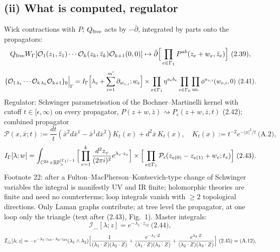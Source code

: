 \documentclass[10pt]{article}
\newcommand{\Itri}{\mathcal I_{\triangle}}
\begin{document}
\subsection{(ii) What is computed, regulator}
Wick contractions with $P$; $Q_{\rm free}$ acts by $-\bar\partial$, integrated by parts onto the propagators:
\begin{equation*}
Q_{\rm free}W_\Gamma[\mathcal O_1(z_1,\bar z_1)\cdots\mathcal O_k(z_k,\bar z_k)\mathcal O_{k+1}(0,0)]\\\mapsto\bar\partial\Big[\prod_{e\in\Gamma_1}P^{ab}(z_e+w_e,\bar z_e)\Big]\ \text{(2.39)},
\end{equation*}
\begin{equation*}
\{\mathcal O_{1\,\lambda_1}\cdots\mathcal O_{k\,\lambda_k}\mathcal O_{k+1}\}_0\Big|_\Gamma=I_\Gamma\Big[\lambda_v+\sum_{i=1}^{m'}\partial_{w_{v,i}};w_e\Big]\\\times\prod_{e\in\Gamma_1}\eta^{a_eb_e}\prod_{v\in\Gamma_0}\prod_{\rm un.}\phi^{a_{v,i}}(w_{v,i},0)\ \text{(2.41)}.
\end{equation*}
Regulator: Schwinger parametrisation of the Bochner--Martinelli kernel with cutoff $t\in[\epsilon,\infty)$ on every propagator, $P(z+w,\bar z)\rightsquigarrow P_\epsilon(z+w,\bar z,t)$ (2.42); combined propagator
\begin{equation*}
\mathcal P(x,\bar x;t):=\frac{dt}{t}(\bar x^2d\bar x^1-\bar x^1d\bar x^2)K_t(x)+d^2\bar x\,K_t(x),\quad K_t(x):=t^{-2}e^{-|x|^2/t}\ \text{(A.2)},
\end{equation*}
\begin{equation*}
I_\Gamma[\lambda;w]=\int_{\mathbb C^{2k}\times\mathbb{RP}^{|\Gamma_1|-1}_>}\Big[\prod_{v=1}^k\frac{d^2z_v}{(2\pi i)^2}e^{\lambda_v\cdot z_v}\Big]\\\times\Big[\prod_{e\in\Gamma_1}\mathcal P_\epsilon(z_{e(0)}-z_{e(1)}+w_e;t_e)\Big]\ \text{(2.43)}.
\end{equation*}
Footnote 22: after a Fulton--MacPherson--Kontsevich-type change of Schwinger variables the integral is manifestly UV and IR finite; holomorphic theories are finite and need no counterterms; loop integrals vanish with $\ge2$ topological directions. Only Laman graphs contribute; at tree level the propagator, at one loop only the triangle (text after (2.43), Fig.~1). Master integrals:
\begin{equation*}
\mathcal I_{\frown}[\lambda;z]=e^{-\lambda_1\cdot z_{12}}\ \text{(2.44)},
\end{equation*}
\begin{equation*}
\Itri[\lambda;z]=-e^{-\lambda_1\cdot z_{13}-\lambda_2\cdot z_{23}}(\lambda_1\wedge\lambda_2)\Big[\frac1{(\lambda_1\cdot Z)(\lambda_2\cdot Z)}\\+\frac{e^{-\lambda_1\cdot Z}}{(\lambda_1\cdot Z)(\lambda_3\cdot Z)}+\frac{e^{\lambda_2\cdot Z}}{(\lambda_2\cdot Z)(\lambda_3\cdot Z)}\Big]\ \text{(2.45)}=\text{(A.12)},
\end{equation*}
\end{document}
